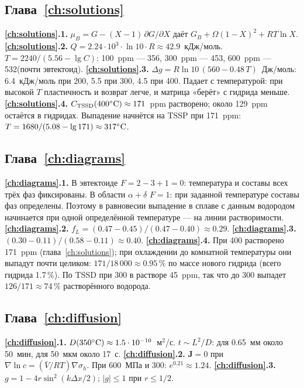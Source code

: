 \subsection*{Глава~\ref{ch:solutions}}
\textbf{\ref{ch:solutions}.1.} $\mu_B = G - (X-1)\,\partial G/\partial X$ даёт $G_B + \Omega(1-X)^2 + RT\ln X$.
\textbf{\ref{ch:solutions}.2.} $Q = 2.24\cdot10^3\cdot\ln10\cdot R \approx 42.9$~кДж/моль. $T = 2240/(5.56-\lg C)$: 100~ppm --- 356\degC,
300~ppm --- 453\degC, 600~ppm --- 532\degC (почти эвтектоид).
\textbf{\ref{ch:solutions}.3.} $\Delta g = R\ln10\,(560 - 0.48\,T)$~Дж/моль: 6.4~кДж/моль при 200\degC, 5.5 при 300\degC, 4.5 при
400\degC. Падает с температурой: при высокой $T$ пластичность и возврат легче, и матрица «берёт» с гидрида меньше.
\textbf{\ref{ch:solutions}.4.} $C_\TSSD(400\degC)\approx171$~ppm растворено; около 129~ppm остаётся в гидридах. Выпадение начнётся на TSSP
при 171~ppm: $T = 1680/(5.08-\lg171)\approx 317\degC$.

\subsection*{Глава~\ref{ch:diagrams}}
\textbf{\ref{ch:diagrams}.1.} В эвтектоиде $F = 2 - 3 + 1 = 0$: температура и составы всех трёх фаз фиксированы. В области $\alpha+\delta$ $F = 1$:
при заданной температуре составы фаз определены. Поэтому в равновесии выпадение в сплаве с данным водородом начинается
при одной определённой температуре --- на линии растворимости.
\textbf{\ref{ch:diagrams}.2.} $f_L = (0.47 - 0.45)/(0.47 - 0.40)\approx0.29$.
\textbf{\ref{ch:diagrams}.3.} $(0.30 - 0.11)/(0.58 - 0.11)\approx0.40$.
\textbf{\ref{ch:diagrams}.4.} При 400\degC{} растворено 171~ppm (глава~\ref{ch:solutions}); при охлаждении до комнатной температуры они
выпадут почти целиком: $171/18\,000\approx0.95\,\%$ по массе нового гидрида (всего гидрида 1.7\,\%). По TSSD при 300\degC{}
в растворе 45~ppm, так что до 300\degC{} выпадет $126/171\approx74\,\%$ растворённого водорода.

\subsection*{Глава~\ref{ch:diffusion}}
\textbf{\ref{ch:diffusion}.1.} $D(350\degC)\approx1.5\cdot10^{-10}$~м$^2$/с. $t\sim L^2/D$: для 0.65~мм около 50~мин, для 50~мкм около 17~с.
\textbf{\ref{ch:diffusion}.2.} $\mathbf J = 0$ при $\nabla\ln c = (\bar V/RT)\nabla\sigma_h$. При 600~МПа и 300\degC: $e^{0.21}\approx1.24$.
\textbf{\ref{ch:diffusion}.3.} $g = 1 - 4r\sin^2(k\Delta x/2)$; $|g|\le1$ при $r\le1/2$.


